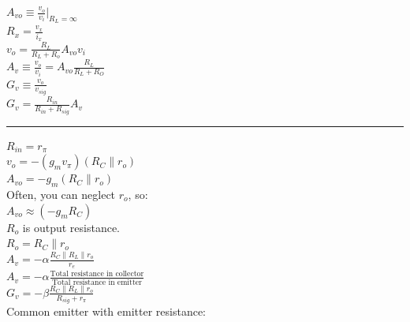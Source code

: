 \documentclass[a4paper]{article}
\newcommand{\hrl}{
    \vspace{2mm}
    \hrule
    \vspace{2mm}
}
\begin{document}
\begin{multicols}{3}
$A_{vo}\equiv \frac{v_o}{v_i}\big|_{R_L=\infty}$\\
$R_x=\frac{v_x}{i_x}$\\

$v_o=\frac{R_L}{R_L + R_o}A_{vo}v_i$\\
$A_v\equiv \frac{v_o}{v_i}=A_{vo}\frac{R_L}{R_L+R_O}$\\

$G_v\equiv \frac{v_o}{v_{sig}}$\\
$G_v=\frac{R_{in}}{R_{in}+R_{sig}}A_v$\\

\hrl

$R_{in}=r_\pi$\\
$v_o=-(g_m v_\pi)(R_C\parallel r_o)$\\
$A_{vo}=-g_m (R_C\parallel r_o)$\\

Often, you can neglect $r_o$, so:\\
$A_{vo}\approx (-g_m R_C)$\\

$R_o$ is output resistance.\\
$R_o = R_C \parallel r_o$\\

$A_v=-\alpha \frac{R_C\parallel R_L \parallel r_o}{r_e}$\\
$A_v=-\alpha \frac{\text{Total resistance in collector}}{\text{Total resistance in emitter}}$\\

$G_v=-\beta \frac{R_C \parallel R_L \parallel r_o}{R_{sig} + r_\pi}$\\

Common emitter with emitter resistance:


\end{multicols}
\end{document}

